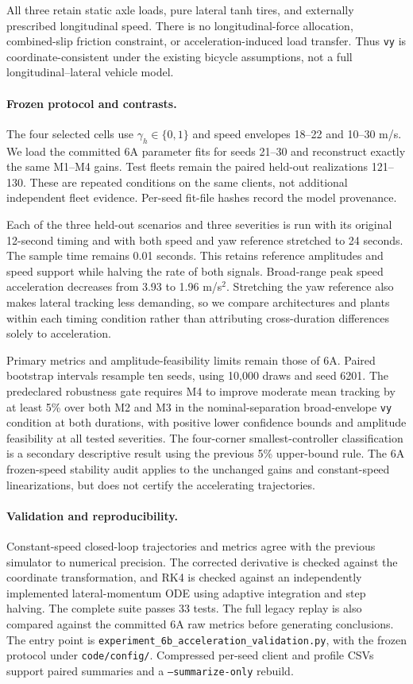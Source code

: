 All three retain static axle loads, pure lateral tanh tires, and externally
prescribed longitudinal speed. There is no longitudinal-force allocation,
combined-slip friction constraint, or acceleration-induced load transfer.
Thus \texttt{vy} is coordinate-consistent under the existing bicycle
assumptions, not a full longitudinal--lateral vehicle model.

\paragraph{Frozen protocol and contrasts.}
The four selected cells use $\gamma_h\in\{0,1\}$ and speed envelopes
18--22 and 10--30 m/s. We load the committed 6A parameter fits for seeds
21--30 and reconstruct exactly the same M1--M4 gains. Test fleets remain
the paired held-out realizations 121--130. These are repeated conditions on
the same clients, not additional independent fleet evidence. Per-seed fit-file
hashes record the model provenance.

Each of the three held-out scenarios and three severities is run with its
original 12-second timing and with both speed and yaw reference stretched to
24 seconds. The sample time remains 0.01 seconds. This retains reference
amplitudes and speed support while halving the rate of both signals. Broad-range
peak speed acceleration decreases from 3.93 to 1.96 m/s$^2$. Stretching the yaw
reference also makes lateral tracking less demanding, so we compare architectures
and plants within each timing condition rather than attributing cross-duration
differences solely to acceleration.

Primary metrics and amplitude-feasibility limits remain those of 6A. Paired
bootstrap intervals resample ten seeds, using 10,000 draws and seed 6201.
The predeclared robustness gate requires M4 to improve moderate mean tracking
by at least 5\% over both M2 and M3 in the nominal-separation broad-envelope
\texttt{vy} condition at both durations, with positive lower confidence bounds
and amplitude feasibility at all tested severities. The four-corner
smallest-controller classification is a secondary descriptive result using
the previous 5\% upper-bound rule. The 6A frozen-speed stability audit applies
to the unchanged gains and constant-speed linearizations, but does not certify
the accelerating trajectories.

\paragraph{Validation and reproducibility.}
Constant-speed closed-loop trajectories and metrics agree with the previous
simulator to numerical precision. The corrected derivative is checked against
the coordinate transformation, and RK4 is checked against an independently
implemented lateral-momentum ODE using adaptive integration and step halving.
The complete suite passes 33 tests. The full legacy replay is also compared
against the committed 6A raw metrics before generating conclusions.
The entry point is \texttt{experiment\_6b\_acceleration\_validation.py}, with
the frozen protocol under \texttt{code/config/}. Compressed per-seed client and
profile CSVs support paired summaries and a \texttt{--summarize-only} rebuild.

